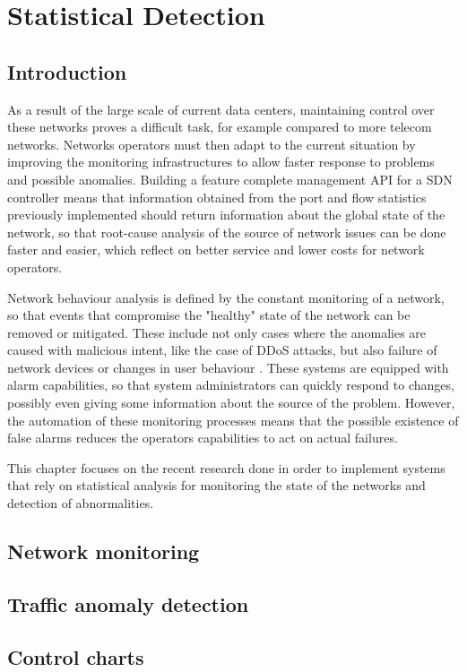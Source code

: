 \chapter{Statistical Detection} \label{chap:stat_det} %

\section {Introduction}

As a result of the large scale of current data centers, maintaining control over these networks proves a difficult task, for example compared to more telecom networks. Networks operators must then adapt to the current situation
by improving the monitoring infrastructures to allow faster response to problems and possible anomalies.  Building a feature complete management API for a SDN controller means that information obtained from the port and 
flow statistics previously implemented should return information about the global state of the network, so that root-cause analysis of the source of network issues can be done faster and easier,
 which reflect on better service and lower costs for network operators. 
\par Network behaviour analysis is defined by the constant monitoring of a network, so that events that compromise the "healthy" state of the network can be removed or mitigated. These include not only cases where the anomalies are
caused with malicious intent, like the case of DDoS attacks, but also failure of network devices or changes in user behaviour \cite {traffic_anomaly_control_charts}. These systems are equipped with alarm capabilities, so that 
system administrators can quickly respond to changes, possibly even giving some information about the source of the problem. However, the automation of these monitoring processes means that the possible existence
of false alarms reduces the operators capabilities to act on actual failures. 
\par This chapter focuses on the recent research done in order to implement systems that rely on statistical analysis for monitoring the state of the networks and detection of abnormalities.

\section {Network monitoring}



\section {Traffic anomaly detection}

\section {Control charts}

